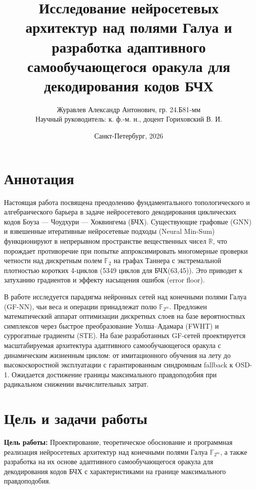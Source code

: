 \documentclass[12pt,a4paper]{article}
\title{\textbf{Исследование нейросетевых архитектур над полями Галуа и разработка адаптивного самообучающегося оракула для декодирования кодов БЧХ}}
\author{Журавлев Александр Антонович, гр. 24.Б81-мм \\
Научный руководитель: к. ф.-м. н., доцент Гориховский В. И.}
\date{Санкт-Петербург, 2026}
\begin{document}
\maketitle

\section*{Аннотация}
Настоящая работа посвящена преодолению фундаментального топологического и алгебраического барьера в задаче нейросетевого декодирования циклических кодов Боуза — Чоудхури — Хоквингема (БЧХ). Существующие графовые (GNN) и взвешенные итеративные нейросетевые подходы (Neural Min-Sum) функционируют в непрерывном пространстве вещественных чисел $\mathbb{R}$, что порождает противоречие при попытке аппроксимировать многомерные проверки четности над дискретным полем $\mathbb{F}_2$ на графах Таннера с экстремальной плотностью коротких 4-циклов (5349 циклов для БЧХ(63,45)). Это приводит к затуханию градиентов и эффекту насыщения ошибок (error floor).

В работе исследуется парадигма нейронных сетей над конечными полями Галуа (GF-NN), чьи веса и операции принадлежат полю $\mathbb{F}_{2^m}$. Предложен математический аппарат оптимизации дискретных слоев на базе вероятностных симплексов через быстрое преобразование Уолша--Адамара (FWHT) и суррогатные градиенты (STE). На базе разработанных GF-сетей проектируется масштабируемая архитектура адаптивного самообучающегося оракула с динамическим жизненным циклом: от имитационного обучения на лету до высокоскоростной эксплуатации с гарантированным синдромным fallback к OSD-1. Ожидается достижение границы максимального правдоподобия при радикальном снижении вычислительных затрат.

\section*{Цель и задачи работы}

\textbf{Цель работы:} Проектирование, теоретическое обоснование и программная реализация нейросетевых архитектур над конечными полями Галуа $\mathbb{F}_{2^m}$, а также разработка на их основе адаптивного самообучающегося оракула для декодирования кодов БЧХ с характеристиками на границе максимального правдоподобия.
\end{document}
